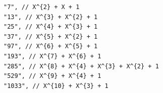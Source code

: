 \begin{verbatim}
"7", // X^{2} + X + 1
"13", // X^{3} + X^{2} + 1
"25", // X^{4} + X^{3} + 1
"37", // X^{5} + X^{2} + 1
"97", // X^{6} + X^{5} + 1
"193", // X^{7} + X^{6} + 1
"285", // X^{8} + X^{4} + X^{3} + X^{2} + 1
"529", // X^{9} + X^{4} + 1
"1033", // X^{10} + X^{3} + 1
\end{verbatim}
